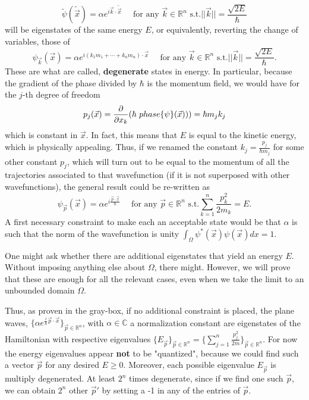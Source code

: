 \documentclass[11pt, a4paper]{article} %
\newcommand{\R}{\mathbb{R}} %
\newcommand{\C}{\mathbb{C}}
\begin{document}
{\begin{equation}
\tilde{\psi}(\tilde{\vec{x}})= \alpha e^{i\vec{k}\cdot\tilde{\vec{x}}} \quad \text{ for any }\vec{k}\in\R^n \text{ s.t.} ||\vec{k}||=\frac{\sqrt{2E}}{\hbar}
\end{equation} 
will be eigenstates of the same energy $E$, or equivalently, reverting the change of variables, those of
\begin{equation}
\psi_{\vec{k}}(\vec{x})= \alpha e^{i(k_1m_1+\cdots+k_nm_n)\cdot\vec{x}} \quad \text{ for any }\vec{k}\in\R^n \text{ s.t.} ||\vec{k}||=\frac{\sqrt{2E}}{\hbar}.
\end{equation}
These are what are called, {\bf degenerate} states in energy. In particular, because the gradient of the phase divided by $\hbar$ is the momentum field, we would have for the $j$-th degree of freedom
\begin{equation}
p_j(\vec{x})=\pdv{}{x_k}\qty(\hbar\ phase\{\psi\}(\vec{x})))=\hbar m_jk_j
\end{equation}
which is constant in $\vec{x}$. In fact, this means that $E$ is equal to the kinetic energy, which is physically appealing. Thus, if we renamed the constant $k_j=\frac{p_j}{\hbar m_j}$ for some other constant $p_j$, which will turn out to be equal to the momentum of all the trajectories associated to that wavefunction (if it is not superposed with other wavefunctions), the general result could be re-written as
\begin{equation}
\psi_{\vec{p}}(\vec{x})=\alpha e^{i\frac{\vec{p}\cdot\vec{x}}{\hbar}} \quad \text{ for any }\vec{p}\in\R^n \text{ s.t.} \sum_{k=1}^n\frac{p_k^2}{2m_k}=E.
\end{equation}
A first necessary constraint to make each an acceptable state would be that $\alpha$ is such that the norm of the wavefunction is unity $\int_\Omega \psi^*(\vec{x})\psi(\vec{x})dx=1$.

One might ask whether there are additional eigenstates that yield an energy $E$. Without imposing anything else about $\Omega$, there might. However, we will prove that these are enough for all the relevant cases, even when we take the limit to an unbounded domain $\Omega$.
}

Thus, as proven in the gray-box, if no additional constraint is placed, the plane waves, $\{\alpha e^{\frac{i}{\hbar}\vec{p}\cdot \vec{x}}\}_{\vec{p}\in\R^n}$, with $\alpha\in\C$ a normalization constant are eigenstates of the Hamiltonian with respective eigenvalues $\{E_{\vec{p}}\}_{\vec{p}\in\R^n}=\{\sum_{j=1}^n\frac{p_j^2}{2m}\}_{\vec{p}\in\R^n}$. For now the energy eigenvalues appear {\bf not} to be "quantized", because we could find such a vector $\vec{p}$ for any desired $E\geq 0$. Moreover, each possible eigenvalue $E_{\vec{p}}$ is multiply degenerated. At least $2^n$ times degenerate, since if we find one such $\vec{p}$, we can obtain $2^n$ other $\vec{p}'$ by setting a -1 in any of the entries of $\vec{p}$.
\end{document}
